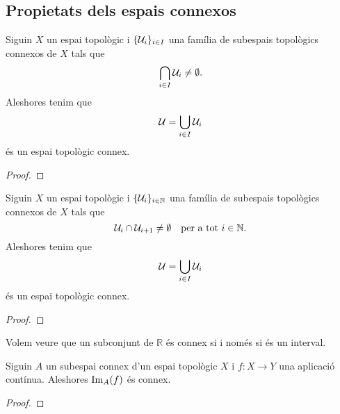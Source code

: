 \documentclass[../../Main.tex]{subfiles}
\begin{document}
	\subsection{Propietats dels espais connexos}
	\begin{proposition}
		\label{prop:la unió d'una família no disjunta de connexos és connexa}
		Siguin \(X\) un espai topològic i \(\{\mathcal{U}_{i}\}_{i\in I}\) una família de subespais topològics connexos de \(X\) tals que
		\[
		    \bigcap_{i\in I}\mathcal{U}_{i}\neq\emptyset.
		\]
		Aleshores tenim que
		\[
		    \mathcal{U}=\bigcup_{i\in I}\mathcal{U}_{i}
		\]
		és un espai topològic connex.
		\begin{proof}
		\end{proof}
	\end{proposition}
	\begin{corollary}
		\label{cor:la unió d'una família numerable de connexos no disjunts dos a dos és connexa}
		Siguin \(X\) un espai topològic i \(\{\mathcal{U}_{i}\}_{i\in\mathbb{N}}\) una família de subespais topològics connexos de \(X\) tals que
		\[
		    \mathcal{U}_{i}\cap\mathcal{U}_{i+1}\neq\emptyset\quad\text{per a tot }i\in\mathbb{N}.
		\]
		Aleshores tenim que
		\[
		    \mathcal{U}=\bigcup_{i\in I}\mathcal{U}_{i}
		\]
		és un espai topològic connex.
		\begin{proof}
		\end{proof}
	\end{corollary}
	\begin{example}
		\label{ex:els connexos en R són els intervals}
		Volem veure que un subconjunt de \(\mathbb{R}\) és connex si i només si és un interval.
		\begin{solution}
		\end{solution}
	\end{example}
	\begin{proposition}
		\label{prop:la connexió és conserva per aplicacions contínues}
		Siguin \(A\) un subespai connex d'un espai topològic \(X\) i \(f\colon X\longrightarrow Y\) una aplicació contínua. Aleshores \(\operatorname{Im}_{A}(f)\) és connex.
		\begin{proof}
		\end{proof}
	\end{proposition}
\end{document}
